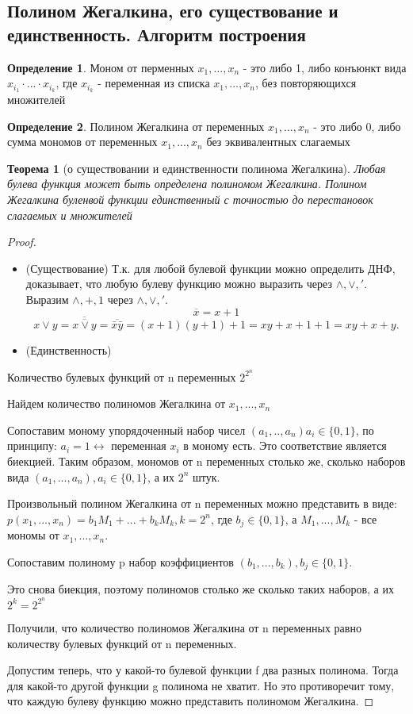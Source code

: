 \documentclass[a4paper]{article}
\newtheorem{theorem}{Теорема}[section]
\theoremstyle{definition}
\newtheorem*{definition}{Определение}
\theoremstyle{remark}
\begin{document}
    \subsection{Полином Жегалкина, его существование и единственность. Алгоритм построения}
	\begin{definition}
		Моном от перменных $x_1, ..., x_n$ - это либо 1, либо конъюнкт вида $x_{i_1} \cdot ... \cdot x_{i_k}$, где $x_{i_k}$ - переменная из списка $x_1, ..., x_n$, без повторяющихся множителей
	\end{definition}
	\begin{definition}
		Полином Жегалкина от переменных $x_1, ..., x_n$ - это либо 0, либо сумма мономов от переменных $x_1, ..., x_n$ без эквивалентных слагаемых
	\end{definition}
	\begin{theorem}[о существовании и единственности полинома Жегалкина]
		Любая булева функция может быть определена полиномом Жегалкина. Полином Жегалкина буленвой функции единственный с точностью до перестановок слагаемых и множителей
	\end{theorem}
	\begin{proof}
        \begin{itemize}
            \item (Существование) Т.к. для любой булевой функции можно определить ДНФ, доказывает, что любую булеву функцию можно выразить через $\wedge, \vee, '$. Выразим  $\wedge, +, 1$ через
            $\wedge, \vee, '$. $$\overline{x} = x + 1$$ $$x \vee y = \overline{\overline{x \vee y}} = \overline{\bar{x}\bar{y}} = (x+1)(y+1) + 1 = xy + x + 1 + 1 = xy + x + y.$$
            \item (Единственность)
        \end{itemize}Количество булевых функций от n переменных $2^{2^n}$
		
		Найдем количество полиномов Жегалкина от $x_1, ..., x_n$
		
		Сопоставим моному упорядоченный набор чисел $(a_1, .., a_n) a_i \in \{0, 1\}$, по принципу: $a_i = 1 \leftrightarrow$ переменная $x_i$ в моному есть. Это соответствие является биекцией. Таким образом, мономов от n переменных столько же, сколько наборов вида $(a_1, ..., a_n), a_i \in \{0, 1\}$, а их $2^n$ штук.
		
		Произвольный полином Жегалкина от n переменных можно представить в виде: $p(x_1, ..., x_n) = b_1M_1 + ... + b_kM_k, k = 2^n$, где $b_j \in \{0, 1\}$, а $M_1, ..., M_k$ - все мономы от $x_1, ..., x_n$.
		
		Сопоставим полиному p набор коэффициентов $(b_1, ..., b_k), b_j \in \{0, 1\}.$
		
		Это снова биекция, поэтому полиномов столько же сколько таких наборов, а их $2^k = 2^{2^n}$
		
		Получили, что количество полиномов Жегалкина от n переменных равно количеству булевых функций от n переменных.
		
		Допустим теперь, что у какой-то булевой функции f два разных полинома. Тогда для какой-то другой функции g полинома не хватит. Но это противоречит тому, что каждую булеву функцию можно представить полиномом Жегалкина.
	\end{proof}
\end{document}
